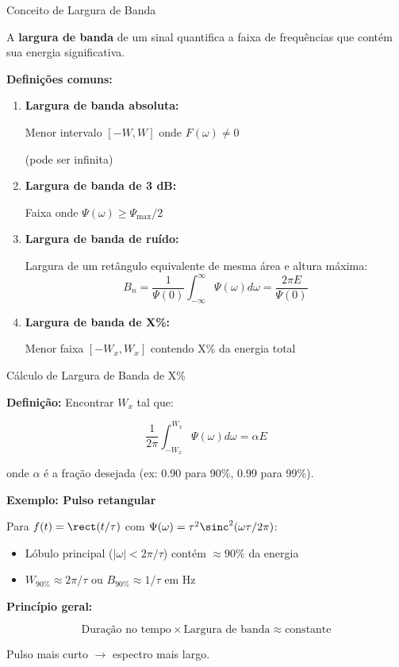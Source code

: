 \begin{frame}{Conceito de Largura de Banda}

A \textbf{largura de banda} de um sinal quantifica a faixa de frequências que contém sua energia significativa.

\textbf{Definições comuns:}

\begin{enumerate}
\item \textbf{Largura de banda absoluta:}
   
   Menor intervalo $[-W, W]$ onde $F(\omega) \neq 0$
   
   (pode ser infinita)

\item \textbf{Largura de banda de 3 dB:}
   
   Faixa onde $\Psi(\omega) \geq \Psi_{\max}/2$

\item \textbf{Largura de banda de ruído:}
   
   Largura de um retângulo equivalente de mesma área e altura máxima:
   \[
   B_n = \frac{1}{\Psi(0)} \int_{-\infty}^{\infty} \Psi(\omega) d\omega = \frac{2\pi E}{\Psi(0)}
   \]

\item \textbf{Largura de banda de X\%:}
   
   Menor faixa $[-W_x, W_x]$ contendo X\% da energia total
\end{enumerate}

\end{frame}


\begin{frame}{Cálculo de Largura de Banda de X\%}

\textbf{Definição:} Encontrar $W_x$ tal que:

\[
\frac{1}{2\pi} \int_{-W_x}^{W_x} \Psi(\omega) d\omega = \alpha E
\]

onde $\alpha$ é a fração desejada (ex: 0.90 para 90\%, 0.99 para 99\%).

\vspace{0.1cm}

\textbf{Exemplo: Pulso retangular}

Para $f(t) = \rect(t/\tau)$ com $\Psi(\omega) = \tau^2 \sinc^2(\omega\tau/2\pi)$:

\begin{itemize}
\item Lóbulo principal ($|\omega| < 2\pi/\tau$) contém $\approx 90\%$ da energia
\item $W_{90\%} \approx 2\pi/\tau$ ou $B_{90\%} \approx 1/\tau$ em Hz
\end{itemize}

\textbf{Princípio geral:}

\[
\text{Duração no tempo} \times \text{Largura de banda} \approx \text{constante}
\]

Pulso mais curto $\rightarrow$ espectro mais largo.

\end{frame}

